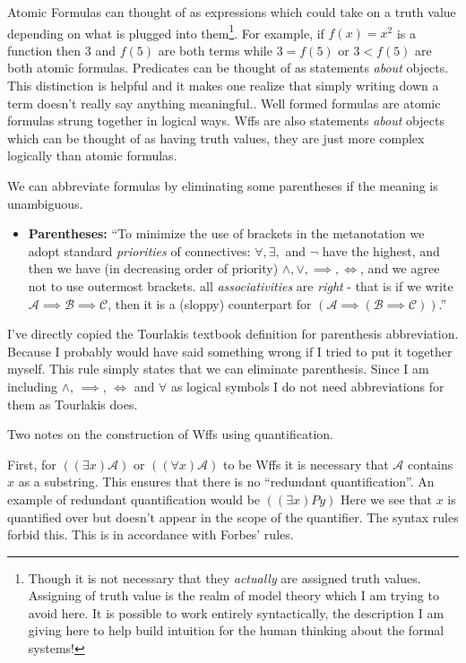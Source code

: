 \documentclass[12pt]{article}
\newcommand{\mc}[1]{\mathcal{#1}}
\begin{document}
Atomic Formulas can thought of as expressions which could take on a truth value depending on what is plugged into them\footnote{Though it is not necessary that they \textit{actually} are assigned truth values. Assigning of truth value is the realm of model theory which I am trying to avoid here. It is possible to work entirely syntactically, the description I am giving here to help build intuition for the human thinking about the formal systems!}. For example, if $f(x)=x^2$ is a function then $3$ and $f(5)$ are both terms while $3 = f(5)$ or $3 < f(5)$ are both atomic formulas. Predicates can be thought of as statements \textit{about} objects. This distinction is helpful and it makes one realize that simply writing down a term doesn't really say anything meaningful.. Well formed formulas are atomic formulas strung together in logical ways. Wffs are also statements \textit{about} objects which can be thought of as having truth values, they are just more complex logically than atomic formulas.

We can abbreviate formulas by eliminating some parentheses if the meaning is unambiguous.

\hrulefill
\begin{itemize}
\item{\textbf{Parentheses:} ``To minimize the use of brackets in the metanotation we adopt standard \textit{priorities} of connectives: $\forall, \exists,$ and $\lnot$ have the highest, and then we have (in decreasing order of priority) $\land, \lor, \implies, \iff$, and we agree not to use outermost brackets. all \textit{associativities} are \textit{right} - that is if we write $\mc{A} \implies \mc{B} \implies \mc{C}$, then it is a (sloppy) counterpart for $(\mc{A} \implies ( \mc{B} \implies \mc{C}))$.''}
\end{itemize}
\hrulefill

I've directly copied the Tourlakis textbook definition for parenthesis abbreviation. Because I probably would have said something wrong if I tried to put it together myself. This rule simply states that we can eliminate parenthesis. Since I am including $\land$, $\implies$, $\iff$ and $\forall$ as logical symbols I do not need abbreviations for them as Tourlakis does.

\vspace{0.5cm}
Two notes on the construction of Wffs using quantification. 

First, for $((\exists x)\mc{A})$ or $((\forall x)\mc{A})$ to be Wffs it is necessary that $\mc{A}$ contains $x$ as a substring. This ensures that there is no ``redundant quantification''. An example of redundant quantification would be $((\exists x)Py)$ Here we see that $x$ is quantified over but doesn't appear in the scope of the quantifier. The syntax rules forbid this. This is in accordance with Forbes' rules.
\end{document}
